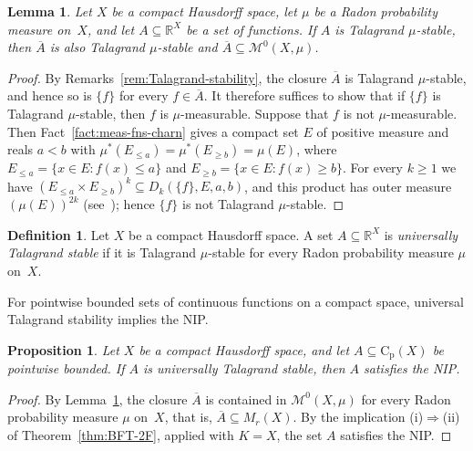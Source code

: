 \documentclass[psamsfonts]{amsart}
\newtheorem{prop}[thm]{Proposition}
\newtheorem{lem}[thm]{Lemma}
\theoremstyle{definition}
\newtheorem{defn}[thm]{Definition}
\theoremstyle{remark}
\newcommand{\Cp}{\mathrm{C}_{\mathrm{p}}}
\numberwithin{equation}{section}
\begin{document}
\begin{lem}\label{lem:talagrand-stab-relcpct}
  Let $X$ be a compact Hausdorff space, let $\mu$ be a Radon probability measure on~$X$, and let $A\subseteq\mathbb{R}^X$ be a set of functions.
  If $A$ is Talagrand $\mu$-stable, then $\overline{A}$ is also Talagrand $\mu$-stable and $\overline{A}\subseteq\mathscr{M}^0(X,\mu)$.
\end{lem}

\begin{proof}
  By Remarks~\ref{rem:Talagrand-stability}, the closure $\overline{A}$ is Talagrand $\mu$-stable, and hence so is $\{f\}$ for every $f\in\overline{A}$.
  It therefore suffices to show that if $\{f\}$ is Talagrand $\mu$-stable, then $f$ is $\mu$-measurable.
  Suppose that $f$ is not $\mu$-measurable.
  Then Fact~\ref{fact:meas-fns-charn} gives a compact set $E$ of positive measure and reals $a<b$ with $\mu^*(E_{\le a})=\mu^*(E_{\ge b})=\mu(E)$, where $E_{\le a}=\{x\in E: f(x)\leq a\}$ and $E_{\ge b}=\{x\in E: f(x)\geq b\}$.
  For every $k\ge1$ we have $(E_{\le a}\times E_{\ge b})^k\subseteq D_k(\{f\},E,a,b)$, and this product has outer measure $(\mu(E))^{2k}$ (see~\cite{talagrand1984pettis});
  hence $\{f\}$ is not Talagrand $\mu$-stable.
\end{proof}

\begin{defn}\label{def:universal-Talagrand}
  Let $X$ be a compact Hausdorff space.
  A set $A\subseteq\mathbb{R}^X$ is \emph{universally Talagrand stable} if it is Talagrand $\mu$-stable for every Radon probability measure $\mu$ on~$X$.
\end{defn}

For pointwise bounded sets of continuous functions on a compact space, universal Talagrand stability implies the NIP.

\begin{prop}\label{prop:Talagrand-implies-NIP}
  Let $X$ be a compact Hausdorff space, and let $A\subseteq \Cp(X)$ be pointwise bounded.
  If $A$ is universally Talagrand stable, then $A$ satisfies the NIP.
\end{prop}

\begin{proof}
  By Lemma~\ref{lem:talagrand-stab-relcpct}, the closure $\overline{A}$ is contained in $\mathscr{M}^0(X,\mu)$ for every Radon probability measure $\mu$ on~$X$, that is, $\overline{A}\subseteq M_r(X)$.
  By the implication (i)$\Rightarrow$(ii) of Theorem~\ref{thm:BFT-2F}, applied with $K=X$, the set $A$ satisfies the NIP.
\end{proof}
\end{document}
